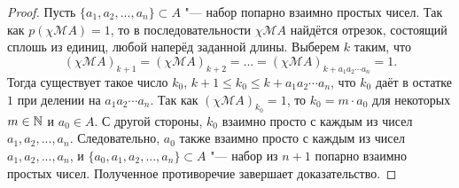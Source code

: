 \begin{proof}
	Пусть $\{a_1, a_2, ..., a_n\}\subset A$ "--- набор попарно взаимно простых чисел.
	Так как $p(\chi\mathscr{M}A)=1$, то в последовательности $\chi\mathscr{M}A$ найдётся отрезок, состоящий сплошь из единиц,
	любой наперёд заданной длины.
	Выберем $k$ таким, что
	\begin{equation}
		(\chi\mathscr{M}A)_{k+1} = (\chi\mathscr{M}A)_{k+2} = ... = (\chi\mathscr{M}A)_{k+a_1a_2\cdots a_n} = 1
		.
	\end{equation}
	Тогда существует такое число $k_0$, $k+1 \leq k_0 \leq k+a_1a_2\cdots a_n$,
	что $k_0$ даёт в остатке $1$ при делении на $a_1a_2\cdots a_n$.
	Так как $(\chi\mathscr{M}A)_{k_0} = 1$, то $k_0 = m\cdot a_0$ для некоторых $m\in\mathbb{N}$ и $a_0\in A$.
	С другой стороны, $k_0$ взаимно просто с каждым из чисел $a_1, a_2, ..., a_n$.
	Следовательно, $a_0$ также взаимно просто с каждым из чисел $a_1, a_2, ..., a_n$,
	и $\{a_0, a_1, a_2, ..., a_n\}\subset A$ "--- набор из $n+1$ попарно взаимно простых чисел.
	Полученное противоречие завершает доказательство.
\end{proof}
